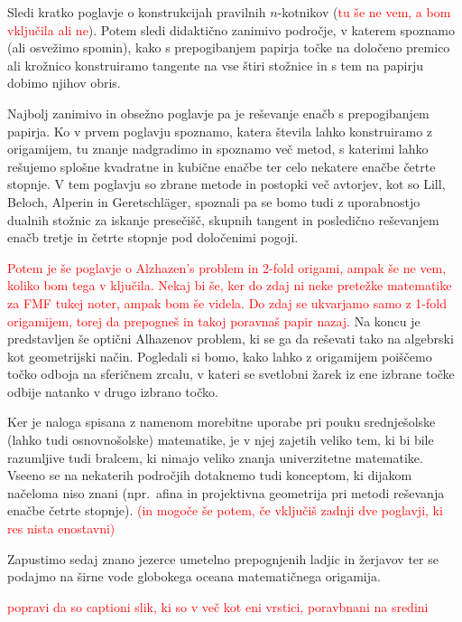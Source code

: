 Sledi kratko poglavje o konstrukcijah pravilnih $n$-kotnikov (\textcolor{red}{tu še ne vem, a bom vključila ali ne}). Potem sledi didaktično zanimivo področje, v katerem spoznamo (ali osvežimo spomin), kako s prepogibanjem papirja točke na določeno premico ali krožnico konstruiramo tangente na vse štiri stožnice in s tem na papirju dobimo njihov obris.

Najbolj zanimivo in obsežno poglavje pa je reševanje enačb s prepogibanjem papirja. Ko v prvem poglavju spoznamo, katera števila lahko konstruiramo z origamijem, tu znanje nadgradimo in spoznamo več metod, s katerimi lahko rešujemo splošne kvadratne in kubične enačbe ter celo nekatere enačbe četrte stopnje. V tem poglavju so zbrane metode in postopki več avtorjev, kot so Lill, Beloch, Alperin in Geretschläger, spoznali pa se bomo tudi z uporabnostjo dualnih stožnic za iskanje presečišč, skupnih tangent in posledično reševanjem enačb tretje in četrte stopnje pod določenimi pogoji.


\textcolor{red}{Potem je še poglavje o Alzhazen's problem in 2-fold origami, ampak še ne vem, koliko bom tega v ključila. Nekaj bi še, ker do zdaj ni neke pretežke matematike za FMF tukej noter, ampak bom še videla. Do zdaj se ukvarjamo samo z 1-fold origamijem, torej da prepogneš in takoj poravnaš papir nazaj.} Na koncu je predstavljen še optični Alhazenov problem, ki se ga da reševati tako na algebrski kot geometrijski način. Pogledali si bomo, kako lahko z origamijem poiščemo točko odboja na sferičnem zrcalu, v kateri se svetlobni žarek iz ene izbrane točke odbije natanko v drugo izbrano točko.

Ker je naloga spisana z namenom morebitne uporabe pri pouku srednješolske (lahko tudi osnovnošolske) matematike, je v njej zajetih veliko tem, ki bi bile razumljive tudi bralcem, ki nimajo veliko znanja univerzitetne matematike. Vseeno se na nekaterih področjih dotaknemo tudi konceptom, ki dijakom načeloma niso znani (npr.\ afina in projektivna geometrija pri metodi reševanja enačbe četrte stopnje). \textcolor{red}{(in mogoče še potem, če vključiš zadnji dve poglavji, ki res nista enostavni)}

Zapustimo sedaj znano jezerce umetelno prepognjenih ladjic in žerjavov ter se podajmo na širne vode globokega oceana matematičnega origamija.

\textcolor{red}{popravi da so captioni slik, ki so v več kot eni vrstici, poravbnani na sredini}